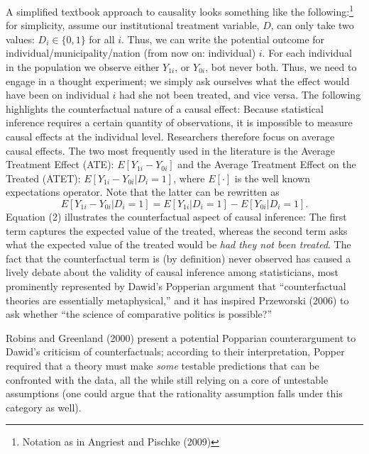 \documentclass[12pt]{article}%
\begin{document}
A simplified textbook approach to causality looks something like the following:\footnote{Notation as in Angriest and Pischke (2009)} for simplicity, assume our institutional treatment variable, $D$, can only take two values: $D_i \in \{0,1\}$ for all $i$. Thus, we can write the potential outcome for individual/municipality/nation (from now on: individual) $i$. For each individual in the population we observe either $Y_{1i}$, or $Y_{0i}$, bot never both. Thus, we need to engage in a thought experiment; we simply ask ourselves what the effect would have been on individual $i$ had she not been treated, and vice versa. The following highlights the counterfactual nature of a causal effect: Because statistical inference requires a certain quantity of observations, it is impossible to measure causal effects at the individual level. Researchers therefore focus on average causal effects. The two most frequently used in the literature is the Average Treatment Effect (ATE): $E[Y_{1i}-Y_{0i}]$ and the Average Treatment Effect on the Treated (ATET): $E[Y_{1i}-Y_{0i}
|D_i=1 ]$, where $E[\cdot]$ is the well known expectations operator. Note that the latter can be rewritten as
\begin{equation}
E[Y_{1i}-Y_{0i}|D_i=1 ]=E[Y_{1i}
|D_i=1 ]-E[Y_{0i}
|D_i=1 ].
\end{equation}
Equation (2) illustrates the counterfactual aspect of causal inference: The first term captures the expected value of the treated, whereas the second term asks what the expected value of the treated would be \textit{had they not been treated}. The fact that the counterfactual term is (by definition) never observed has caused a lively debate about the validity of causal inference among statisticians, most prominently represented by Dawid's Popperian argument that ``counterfactual theories are essentially metaphysical,'' and it has inspired Przeworski (2006) to ask whether ``the science of comparative politics is possible?''

Robins and Greenland (2000) present a potential Popparian counterargument to Dawid's criticism of counterfactuals; according to their interpretation, Popper required that a theory must make \textit{some} testable predictions that can be confronted with the data, all the while still relying on a core of untestable assumptions (one could argue that the rationality assumption falls under this category as well). \\

\end{document}
